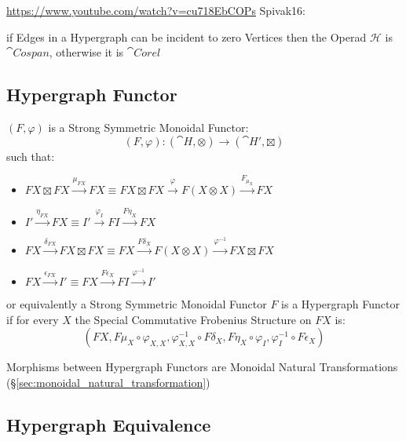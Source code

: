 \asterism

\url{https://www.youtube.com/watch?v=cu718EbCOPs} Spivak16:

if Edges in a Hypergraph can be incident to zero Vertices then the
Operad $\mathcal{H}$ is $\cat{Cospan}$, otherwise it is $\cat{Corel}$




\subsection{Hypergraph Functor}\label{sec:hypergraph_functor}

$(F,\varphi)$ is a Strong Symmetric Monoidal Functor:
\[
  (F,\varphi) : (\cat{H},\otimes) \rightarrow (\cat{H}',\boxtimes)
\]
such that:
\begin{itemize}
  \item $FX \boxtimes FX \xrightarrow{\mu_{FX}} FX
    \equiv FX \boxtimes FX \xrightarrow{\varphi} F(X \otimes X)
      \xrightarrow{F_{\mu_X}} FX$
  \item $I' \xrightarrow{\eta_{FX}} FX
    \equiv I' \xrightarrow{\varphi_I} FI \xrightarrow{F \eta_X} FX$
  \item $FX \xrightarrow{\delta_{FX}} FX \boxtimes FX
    \equiv FX \xrightarrow{F\delta_X} F(X \otimes X)
      \xrightarrow{\varphi^{-1}} FX \boxtimes FX$
  \item $FX \xrightarrow{\epsilon_{FX}} I'
    \equiv FX \xrightarrow{F \epsilon_X} FI
      \xrightarrow{\varphi^{-1}} I'$
\end{itemize} %
or equivalently a Strong Symmetric Monoidal Functor $F$ is a
Hypergraph Functor if for every $X$ the Special Commutative Frobenius
Structure on $FX$ is:
\[
  (FX, F\mu_X \circ \varphi_{X,X}, \varphi^{-1}_{X,X} \circ F\delta_X,
    F\eta_X \circ \varphi_I, \varphi^{-1}_I \circ F\epsilon_X)
\]

Morphisms between Hypergraph Functors are Monoidal Natural
Transformations (\S\ref{sec:monoidal_natural_transformation})



\subsection{Hypergraph Equivalence}\label{sec:hypergraph_equivalence}


